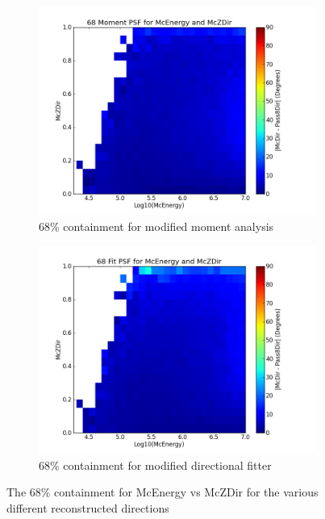 \documentclass[11pt]{article}
\begin{document}
\begin{figure}[h]
                \begin{subfigure}[b]{0.5\textwidth}
                \centering
                \includegraphics[width=\textwidth]{psf68_2D_moment}
                \caption{68\% containment for modified moment analysis}
                \label{con68_moment}
        \end{subfigure}%
        \begin{subfigure}[b]{0.5\textwidth}
                \centering
                \includegraphics[width=\textwidth]{psf68_2D_fit}
                \caption{68\% containment for modified directional fitter}
                \label{con68_fit}
        \end{subfigure}
        \caption{The 68\% containment for McEnergy vs McZDir for the various different reconstructed directions }
        \label{con68}
\end{figure}
\end{document}
